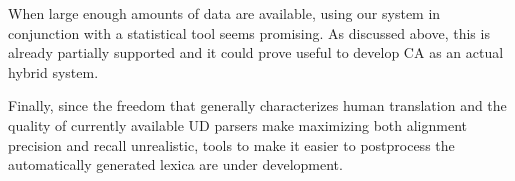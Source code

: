 \documentclass[11pt]{article}
\begin{document}
When large enough amounts of data are available, using our system in conjunction with a statistical tool seems promising. 
As discussed above, this is already partially supported and it could prove useful to develop CA as an actual hybrid system. 

Finally, since the freedom that generally characterizes human translation and the quality of currently available UD parsers make maximizing both alignment precision and recall unrealistic, tools to make it easier to postprocess the automatically generated lexica are under development.

  
 
\end{document}
